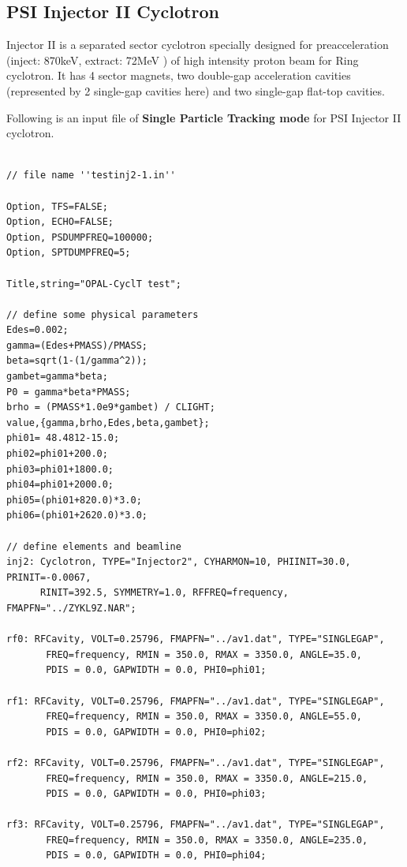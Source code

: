 \subsection{PSI  Injector II Cyclotron}
\label{sec:inj2}
Injector II is a separated sector cyclotron specially designed for preacceleration (inject: 870keV, extract: 72MeV )
of high intensity proton beam for Ring cyclotron. It has 4 sector magnets, two double-gap acceleration cavities 
(represented by 2 single-gap cavities here) and two single-gap flat-top cavities.  

Following is an input file of {\bfseries Single Particle Tracking mode} for PSI Injector II cyclotron.
{ \footnotesize 
\begin{verbatim}

// file name ''testinj2-1.in''

Option, TFS=FALSE;
Option, ECHO=FALSE;
Option, PSDUMPFREQ=100000;
Option, SPTDUMPFREQ=5;

Title,string="OPAL-CyclT test";

// define some physical parameters 
Edes=0.002;
gamma=(Edes+PMASS)/PMASS;
beta=sqrt(1-(1/gamma^2));
gambet=gamma*beta;
P0 = gamma*beta*PMASS;
brho = (PMASS*1.0e9*gambet) / CLIGHT;
value,{gamma,brho,Edes,beta,gambet};
phi01= 48.4812-15.0;
phi02=phi01+200.0;
phi03=phi01+1800.0;
phi04=phi01+2000.0;
phi05=(phi01+820.0)*3.0;
phi06=(phi01+2620.0)*3.0;

// define elements and beamline
inj2: Cyclotron, TYPE="Injector2", CYHARMON=10, PHIINIT=30.0, PRINIT=-0.0067,
      RINIT=392.5, SYMMETRY=1.0, RFFREQ=frequency, FMAPFN="../ZYKL9Z.NAR";

rf0: RFCavity, VOLT=0.25796, FMAPFN="../av1.dat", TYPE="SINGLEGAP", 
       FREQ=frequency, RMIN = 350.0, RMAX = 3350.0, ANGLE=35.0,
       PDIS = 0.0, GAPWIDTH = 0.0, PHI0=phi01; 

rf1: RFCavity, VOLT=0.25796, FMAPFN="../av1.dat", TYPE="SINGLEGAP", 
       FREQ=frequency, RMIN = 350.0, RMAX = 3350.0, ANGLE=55.0,
       PDIS = 0.0, GAPWIDTH = 0.0, PHI0=phi02; 

rf2: RFCavity, VOLT=0.25796, FMAPFN="../av1.dat", TYPE="SINGLEGAP", 
       FREQ=frequency, RMIN = 350.0, RMAX = 3350.0, ANGLE=215.0,  
       PDIS = 0.0, GAPWIDTH = 0.0, PHI0=phi03; 

rf3: RFCavity, VOLT=0.25796, FMAPFN="../av1.dat", TYPE="SINGLEGAP", 
       FREQ=frequency, RMIN = 350.0, RMAX = 3350.0, ANGLE=235.0,  
       PDIS = 0.0, GAPWIDTH = 0.0, PHI0=phi04; 


\end{verbatim}}
